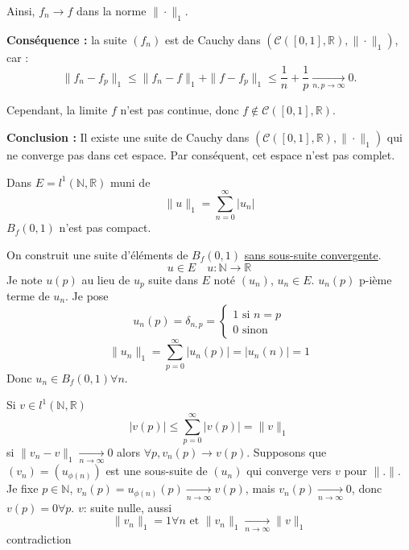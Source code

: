 \documentclass[a4paper]{report}
\newcommand\N{\ensuremath{\mathbb{N}}}
\newcommand\R{\ensuremath{\mathbb{R}}}
\theoremstyle{definition}
\begin{document}
\begin{preuve}
Ainsi, $f_n \to f$ dans la norme $\| \cdot \|_1$.

\medskip

\textbf{Conséquence :} la suite $(f_n)$ est de Cauchy dans $\left( \mathcal{C}([0,1], \mathbb{R}), \| \cdot \|_1 \right)$, car :
\[
\|f_n - f_p\|_1 \le \|f_n - f\|_1 + \|f - f_p\|_1 \le \frac{1}{n} + \frac{1}{p} \xrightarrow[n,p \to \infty]{} 0.
\]

Cependant, la limite $f$ n’est pas continue, donc $f \notin \mathcal{C}([0,1], \mathbb{R})$.

\medskip

\textbf{Conclusion :} Il existe une suite de Cauchy dans $\left( \mathcal{C}([0,1], \mathbb{R}), \| \cdot \|_1 \right)$ qui ne converge pas dans cet espace. Par conséquent, cet espace n’est pas complet.

\end{preuve}
\begin{lemma}
    Dans $E = l^{1}(\N, \R)$ muni de
    \[
    \|u\|_1 = \sum_{n=0}^{\infty} |u_n|
    \] 
    $B_f(0, 1)$ n'est pas compact.
\end{lemma}
\begin{preuve}
    On construit une suite d'éléments de $B_f(0, 1)$ \underline{sans sous-suite convergente}.
    \[
    u \in E \quad u: \N \to \R
    \] 
    Je note $u(p)$ au lieu de  $u_p$ suite dans  $E$ noté  $(u_n)$,  $u_n \in E$. $u_n(p)$ p-ième terme de  $u_n$. Je pose  
    \[
    u_n(p) = \delta_{n, p} = \begin{cases}
        1 \text{ si } n = p\\
        0 \text{ sinon}
    \end{cases}
    \] 
    \[
    \|u_n\|_1 = \sum_{p=0}^{\infty} |u_n(p)| = |u_n(n)| = 1
    \] 
    Donc $u_n \in B_f(0, 1) \forall n$.
    \par
    Si $v \in l^1(\N, \R)$
    \[
    |v(p)| \le \sum_{p=0}^{\infty} |v(p)| = \|v\|_1
    \] 
    si $\|v_n - v\|_1 \xrightarrow[n \to \infty]{} 0$ alors $\forall p, v_n(p) \to v(p)$. Supposons que $(v_n) = (u_{\phi(n)})$ est une sous-suite de $(u_n)$ qui converge vers  $v$ pour  $\| . \|$. Je fixe $p \in \N$, $v_n(p) = u_{\phi(n)}(p) \xrightarrow[n \to \infty]{} v(p)$, mais $v_n(p) \xrightarrow[n \to \infty]{} 0$, donc $v(p) = 0 \forall p$. $v$: suite nulle, aussi 
     \[
    \|v_n\|_1 = 1 \forall n \text{ et } \|v_n\|_1 \xrightarrow[n \to \infty]{} \|v\|_1
    \] 
    contradiction
\end{preuve}
\end{document}
